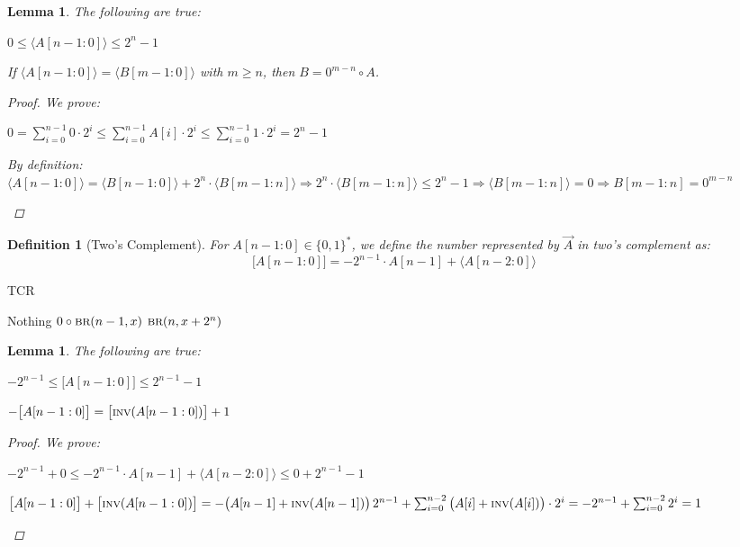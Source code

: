 \documentclass[12pt]{article}
\let\RA\Rightarrow
\let\oor\vee
\newcommand{\scr}[1]{{\scriptstyle\textup{#1}}}
\newcommand{\scrf}[1]{{\scriptstyle\textup{\footnotesize #1}}}
\DeclareMathOperator{\N}{\mathbb{N}}
\newcommand*{\B}{\{0,1\}}
\newcommand{\repr}[1]{\langle{#1}\rangle}
\newcommand{\trepr}[1]{\big[{#1}\big]}
\newtheorem{definition}[theorem]{Definition}
\newtheorem{lemma}[theorem]{Lemma}
\begin{document}
\begin{lemma}
  The following are true:
  \begin{compactenum}[(i)]
    \item $0\leq \repr{A[n-1:0]}\leq 2^n-1$
    \item If $\repr{A[n-1:0]}=\repr{B[m-1:0]}$ with $m\geq n$, then $B=0^{m-n}\circ A$.
  \end{compactenum}
  \begin{proof}
    We prove:
    \begin{compactenum}[(i)]
      \item $0=\sum_{i=0}^{n-1}0\cdot 2^i\leq \sum_{i=0}^{n-1}A[i]\cdot 2^i \leq \sum_{i=0}^{n-1}1\cdot 2^i= 2^n-1$
      \item By definition: $\repr{A[n-1:0]}=\repr{B[n-1:0]}+2^n\cdot\repr{B[m-1:n]}\RA 2^n\cdot\repr{B[m-1:n]}\leq 2^n-1\RA \repr{B[m-1:n]}=0\RA B[m-1:n]=0^{m-n}$
    \end{compactenum}
  \end{proof}
\end{lemma}

\begin{definition}[Two's Complement]
  For $A[n-1:0]\in \B^*$, we define the number represented by $\vec{A}$ in two's complement as: $$\trepr{A[n-1:0]}=-2^{n-1}\cdot A[n-1]+\repr{A[n-2:0]}$$
\end{definition}

\begin{algorithm}[H]
  \caption{TCR}
  \begin{algorithmic}
    \Function{$\scrf{TCR}$}{$n,x\in\N$}
      \If{$x\geq 2^{n-1}\oor x\leq -2^{n-1}-1$}
        \State\Return Nothing
        \State \Return $0\circ\scrf{BR}(n-1,x)$
        \State \Return $\scrf{BR}(n,x+2^n)$
      \EndIf
    \EndFunction
  \end{algorithmic}
  \label{BR'}
\end{algorithm}

\begin{lemma}
  \label{twos_inv}
  The following are true:
  \begin{compactenum}[(i)]
    \item $-2^{n-1}\leq \trepr{A[n-1:0]}\leq 2^{n-1}-1$
    \item $-\trepr{A[n-1:0]}=\trepr{\scr{INV}(A[n-1:0])}+1$
  \end{compactenum}
  \begin{proof}
    We prove:
    \begin{compactenum}[(i)]
      \item $-2^{n-1}+0\leq -2^{n-1}\cdot A[n-1]+\repr{A[n-2:0]} \leq 0+2^{n-1}-1$
      \item $\trepr{A[n-1:0]}+\trepr{\scr{INV}(A[n-1:0])}=-\big(A[n-1]+\scr{INV}(A[n-1])\big)\,2^{n-1}+\sum_{i=0}^{n-2}\big(A[i]+\scr{INV}(A[i])\big)\cdot 2^i=-2^{n-1}+\sum_{i=0}^{n-2}2^i=1$
    \end{compactenum}
  \end{proof}
\end{lemma}
\end{document}
